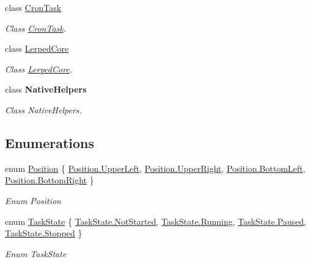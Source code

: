 \begin{DoxyCompactItemize}
class \hyperlink{class_lerp2_a_p_i_1_1_cron_task}{Cron\+Task}
\begin{DoxyCompactList}\small\item\em Class \hyperlink{class_lerp2_a_p_i_1_1_cron_task}{Cron\+Task}. \end{DoxyCompactList}\item 
class \hyperlink{class_lerp2_a_p_i_1_1_lerped_core}{Lerped\+Core}
\begin{DoxyCompactList}\small\item\em Class \hyperlink{class_lerp2_a_p_i_1_1_lerped_core}{Lerped\+Core}. \end{DoxyCompactList}\item 
class {\bfseries Native\+Helpers}
\begin{DoxyCompactList}\small\item\em Class Native\+Helpers. \end{DoxyCompactList}\end{DoxyCompactItemize}
\subsection*{Enumerations}
\begin{DoxyCompactItemize}
\item 
enum \hyperlink{namespace_lerp2_a_p_i_a5b0f263f740f1f4c8b67cf0c011dd90d}{Position} \{ \hyperlink{namespace_lerp2_a_p_i_a5b0f263f740f1f4c8b67cf0c011dd90da6f43ca0793e0c68184761673278f4ca4}{Position.\+Upper\+Left}, 
\hyperlink{namespace_lerp2_a_p_i_a5b0f263f740f1f4c8b67cf0c011dd90da894d4b94cedce8501ff5165b6863ea3a}{Position.\+Upper\+Right}, 
\hyperlink{namespace_lerp2_a_p_i_a5b0f263f740f1f4c8b67cf0c011dd90da98e5a1c44509157ebcaf46c515c78875}{Position.\+Bottom\+Left}, 
\hyperlink{namespace_lerp2_a_p_i_a5b0f263f740f1f4c8b67cf0c011dd90da9146bfc669fddc88db2c4d89297d0e9a}{Position.\+Bottom\+Right}
 \}\begin{DoxyCompactList}\small\item\em Enum Position \end{DoxyCompactList}
\item 
enum \hyperlink{namespace_lerp2_a_p_i_a2bd1eb398ec1f41af93fa4ee7408681e}{Task\+State} \{ \hyperlink{namespace_lerp2_a_p_i_a2bd1eb398ec1f41af93fa4ee7408681eafa7be7845bc42b3491d9d0377958be94}{Task\+State.\+Not\+Started}, 
\hyperlink{namespace_lerp2_a_p_i_a2bd1eb398ec1f41af93fa4ee7408681ea5bda814c4aedb126839228f1a3d92f09}{Task\+State.\+Running}, 
\hyperlink{namespace_lerp2_a_p_i_a2bd1eb398ec1f41af93fa4ee7408681eae99180abf47a8b3a856e0bcb2656990a}{Task\+State.\+Paused}, 
\hyperlink{namespace_lerp2_a_p_i_a2bd1eb398ec1f41af93fa4ee7408681eac23e2b09ebe6bf4cb5e2a9abe85c0be2}{Task\+State.\+Stopped}
 \}\begin{DoxyCompactList}\small\item\em Enum Task\+State \end{DoxyCompactList}
\end{DoxyCompactItemize}


